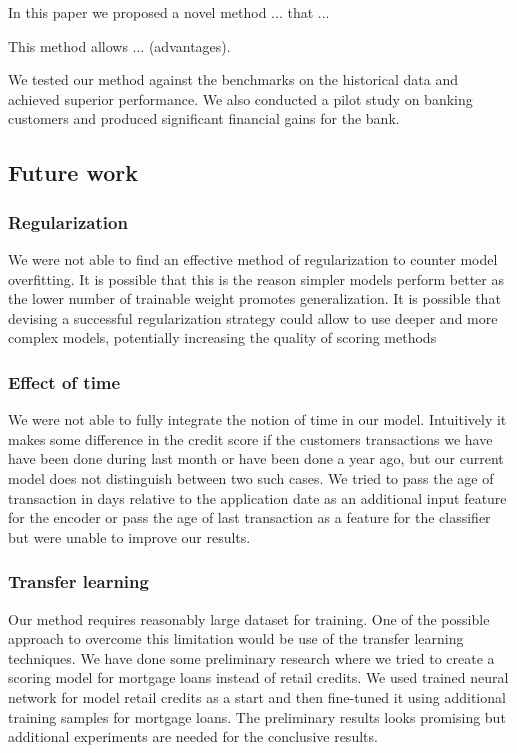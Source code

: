 \documentclass[sigconf]{acmart}
\begin{document}
In this paper we proposed a novel method ... that ...

This method allows ... (advantages).

We tested our method against the benchmarks on the historical data and achieved superior performance.
We also conducted a pilot study on banking customers and produced significant financial gains for the bank.

\subsection{Future work}

\subsubsection{Regularization}

We were not able to find an effective method of regularization to counter model overfitting. It is possible that this is the reason simpler models perform better as the lower number of trainable weight promotes generalization. It is possible that devising a successful regularization strategy could allow to use deeper and more complex models, potentially increasing the quality of scoring methods

\subsubsection{Effect of time}

We were not able to fully integrate the notion of time in our model. Intuitively it makes some difference in the credit score if the customers transactions we have have been done during last month or have been done a year ago, but our current model does not distinguish between two such cases. We tried to pass the age of transaction in days relative to the application date as an additional input feature for the encoder or pass the age of last transaction as a feature for the classifier but were unable to improve our results. 

\subsubsection{Transfer learning}

Our method requires reasonably large dataset for training. One of the possible approach to overcome this limitation would be use of the transfer learning techniques. We have done some preliminary research where we tried to create a scoring model for mortgage loans instead of retail credits. We used trained neural network for model retail credits as a start and then fine-tuned it using additional training samples for mortgage loans. The preliminary results looks promising but additional experiments are needed for the conclusive results.




\end{document}
